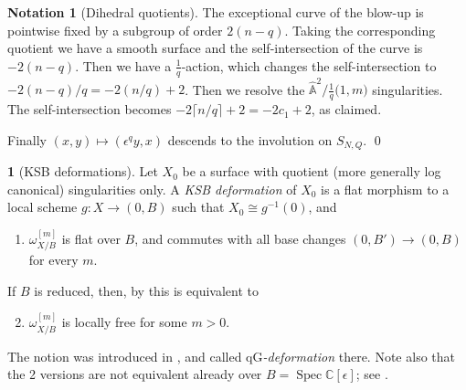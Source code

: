 \documentclass{amsart}
\theoremstyle{definition}
\newtheorem{say}[thm]{}
\newtheorem{notation}[thm]{Notation}
\theoremstyle{remark}
\renewcommand{\c}[0]{{\mathbb C}}
\renewcommand{\a}[0]{\hat{\mathbb A}}
\newcommand{\spec}[0]{\operatorname{Spec}}
\newcommand{\rup}[1]{\lceil{#1}\rceil}
\newcommand{\qg}[0]{\ensuremath{\mathrm{qG}}}
\begin{document}
\begin{notation}[Dihedral quotients]
The exceptional curve of the blow-up is   pointwise fixed by a subgroup of order $2(n-q)$. Taking the corresponding quotient we have  a smooth surface and the self-intersection of the curve is $-2(n-q)$. Then we have a $\frac1{q}$-action, which changes the  self-intersection to $-2(n-q)/q=-2(n/q)+2$. Then we resolve the  $\a^2/\tfrac1{q}\bigl(1, m\bigr)$ singularities. The self-intersection becomes   $-2\rup{n/q}+2=-2c_1+2$, as claimed.

Finally  $(x, y)\mapsto (\epsilon^q y, x)$  descends to the involution on 
$S_{N,Q}$. \qed 
\end{notation}



\begin{say}[KSB deformations]\label{ksb.defs.say.0}
  Let $X_0$ be a surface with quotient (more generally log canonical) singularities only. A {\it KSB deformation} of $X_0$ 
  is a flat morphism to a local scheme $g: X\to (0,B)$ such that
  $X_0\cong g^{-1}(0)$, and
  \begin{enumerate}
  \item $\omega_{X/B}^{[m]}$ is flat over $B$, and  commutes with all base changes $(0,B')\to (0, B)$ for every $m$.
  \end{enumerate}
  If $B$ is reduced, then, by \cite[2.3 and 4.7]{k-modbook} this is equivalent to 
\begin{enumerate}\setcounter{enumi}{1}
  \item $\omega_{X/B}^{[m]}$ is locally free for some  $m>0$.
\end{enumerate}
The notion was introduced in \cite{ksb}, and called {\it  $\qg$-deformation} there. Note also that the 2 versions are not equivalent already over
$B=\spec \c[\epsilon]$; see \cite{k-alt}. 
\end{say}
\end{document}

